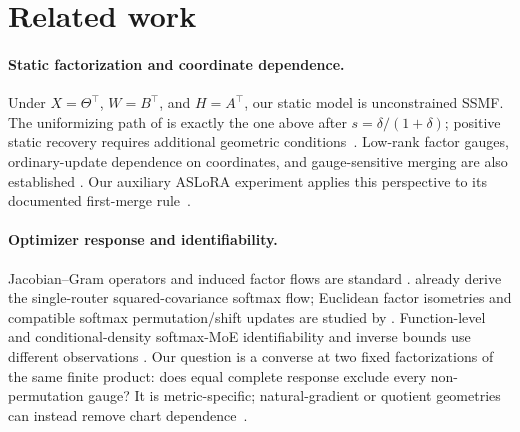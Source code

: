 \section{Related work}
\label{sec:related-work}

\paragraph{Static factorization and coordinate dependence.}
Under $X=\Theta^\top$, $W=B^\top$, and $H=A^\top$, our static model is
unconstrained SSMF. The uniformizing path of
\citet[Sec.~IV-A]{vuthanh2023bounded} is exactly the one above after
$s=\delta/(1+\delta)$; positive static recovery requires additional
geometric conditions~\citep{fu2018identifiability,abdolali2021simplex}.
Low-rank factor gauges, ordinary-update dependence on coordinates, and
gauge-sensitive merging are also established
\citep{yen2025lora,zheng2026loras,gong2026twistedmerge}.
Our auxiliary ASLoRA experiment applies this perspective to its documented
first-merge rule~\citep{hu2024aslorav2}.

\paragraph{Optimizer response and identifiability.}
Jacobian--Gram operators and induced factor flows are standard
\citep{jacot2018neural,marcotte2026intrinsic}.
\citet[Lem.~D.2]{varre2026gradient} already derive the single-router
squared-covariance softmax flow; Euclidean factor isometries and compatible
softmax permutation/shift updates are studied by
\citet{singh2026loss,lau2026symmetry}.
Function-level and conditional-density softmax-MoE identifiability and
inverse bounds use different observations
\citep{tran2025linear,nguyen2023demystifying}.
Our question is a converse at two fixed factorizations of the same finite
product: does equal complete response exclude every non-permutation gauge?
It is metric-specific; natural-gradient or quotient geometries can instead
remove chart dependence~\citep{vanoostrum2023invariance,mishra2014fixedrank}.

